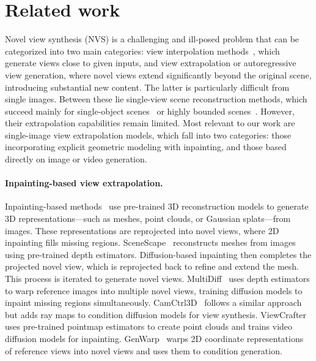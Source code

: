 \section{Related work}%
\label{sec:related}

Novel view synthesis (NVS) is a challenging and ill-posed problem that can be categorized into two main categories: view interpolation methods~\cite{niemeyer2022regnerf, chen2021mvsnerf, chen_single-stage_2023, chen2024mvsplat, chen2024mvsplat360, wu2024reconfusion, truong2023sparf, gao2024cat3d}, which generate views close to given inputs, and view extrapolation or autoregressive view generation, where novel views extend significantly beyond the original scene, introducing substantial new content.
The latter is particularly difficult from single images.
Between these lie single-view scene reconstruction methods, which succeed mainly for single-object scenes~\cite{melas-kyriazi23realfusion, shi23zero123:, hong24lrm:, szymanowicz24splatter, boss2024sf3d, xiang2024structured} or highly bounded scenes~\cite{szymanowicz2024flash3d}.
However, their extrapolation capabilities remain limited.
Most relevant to our work are single-image view extrapolation models, which fall into two categories: those incorporating explicit geometric modeling with inpainting, and those based directly on image or video generation.

\paragraph{Inpainting-based view extrapolation.}
Inpainting-based methods~\cite{wiles2020synsin, SceneScape, hoellein2023text2room, muller2024multidiff, popov24camctrl3d, yu2024viewcrafter, seo2024genwarp, koh2023simple, liu2021infinite, rockwell2021pixelsynth, yu23wonderjourney:, yu25wonderworld:} use pre-trained 3D reconstruction models to generate 3D representations—such as meshes, point clouds, or Gaussian splats—from images.
These representations are reprojected into novel views, where 2D inpainting fills missing regions.
SceneScape~\cite{SceneScape} reconstructs meshes from images using pre-trained depth estimators.
Diffusion-based inpainting then completes the projected novel view, which is reprojected back to refine and extend the mesh.
This process is iterated to generate novel views.
MultiDiff~\cite{muller2024multidiff} uses depth estimators to warp reference images into multiple novel views, training diffusion models to inpaint missing regions simultaneously.
CamCtrl3D~\cite{popov24camctrl3d} follows a similar approach but adds ray maps to condition diffusion models for view synthesis.
ViewCrafter~\cite{yu2024viewcrafter} uses pre-trained pointmap estimators to create point clouds and trains video diffusion models for inpainting.
GenWarp~\cite{seo2024genwarp} warps 2D coordinate representations of reference views into novel views and uses them to condition generation.

